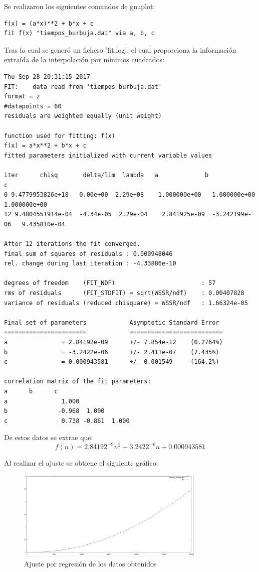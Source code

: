\documentclass[paper=a4, fontsize=10pt]{scrartcl} %
\begin{document}
Se realizaron los siguientes comandos de gnuplot:

\begin{lstlisting}
f(x) = (a*x)**2 + b*x + c
fit f(x) "tiempos_burbuja.dat" via a, b, c
\end{lstlisting}

Tras lo cual se generó un fichero 'fit.log', el cual proporciona la información extraída de la interpolación por mínimos cuadrados:

\begin{lstlisting}
Thu Sep 28 20:31:15 2017
FIT:    data read from 'tiempos_burbuja.dat'
format = z
#datapoints = 60
residuals are weighted equally (unit weight)

function used for fitting: f(x)
f(x) = a*x**2 + b*x + c
fitted parameters initialized with current variable values

iter      chisq       delta/lim  lambda   a             b             c            
0 9.4779953826e+18   0.00e+00  2.29e+08    1.000000e+00   1.000000e+00   1.000000e+00
12 9.4804551914e-04  -4.34e-05  2.29e-04    2.841925e-09  -3.242199e-06   9.435810e-04

After 12 iterations the fit converged.
final sum of squares of residuals : 0.000948046
rel. change during last iteration : -4.33886e-10

degrees of freedom    (FIT_NDF)                        : 57
rms of residuals      (FIT_STDFIT) = sqrt(WSSR/ndf)    : 0.00407828
variance of residuals (reduced chisquare) = WSSR/ndf   : 1.66324e-05

Final set of parameters            Asymptotic Standard Error
=======================            ==========================
a               = 2.84192e-09      +/- 7.854e-12    (0.2764%)
b               = -3.2422e-06      +/- 2.411e-07    (7.435%)
c               = 0.000943581      +/- 0.001549     (164.2%)

correlation matrix of the fit parameters:
a      b      c      
a               1.000 
b              -0.968  1.000 
c               0.738 -0.861  1.000 
\end{lstlisting}

De estos datos se extrae que: 
\[
f(n) = 2.84192^{-9}n^2 -3.2422^{-6}n + 0.000943581
\]

Al realizar el ajuste se obtiene el siguiente gráfico:

\begin{figure}[H] %
	\centering
	\label{lsblk}
	\includegraphics[width=0.8\textwidth]{../imgs/c3.PNG}
	\caption{Ajuste por regresión de los datos obtenidos} 
\end{figure}
\end{document}
